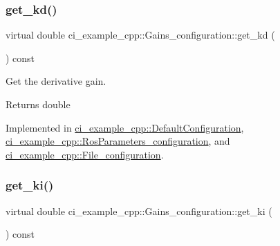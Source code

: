\mbox{\label{classci__example__cpp_1_1Gains__configuration_a4bc25c0a8283f36366b888feaf15efa9}} 
\subsubsection{\texorpdfstring{get\+\_\+kd()}{get\_kd()}}
{\footnotesize\ttfamily virtual double ci\+\_\+example\+\_\+cpp\+::\+Gains\+\_\+configuration\+::get\+\_\+kd (\begin{DoxyParamCaption}{ }\end{DoxyParamCaption}) const\hspace{0.3cm}{\ttfamily [pure virtual]}}



Get the derivative gain. 

\begin{DoxyReturn}{Returns}
double 
\end{DoxyReturn}


Implemented in \hyperlink{classci__example__cpp_1_1DefaultConfiguration_a5eee0c350de525150b04c81a72cd5932}{ci\+\_\+example\+\_\+cpp\+::\+Default\+Configuration}, \hyperlink{classci__example__cpp_1_1RosParameters__configuration_a90eb8bc0d9b4b663cde21fe07d44847e}{ci\+\_\+example\+\_\+cpp\+::\+Ros\+Parameters\+\_\+configuration}, and \hyperlink{classci__example__cpp_1_1File__configuration_a14b1e36766d55ee0132a78fbc41f8096}{ci\+\_\+example\+\_\+cpp\+::\+File\+\_\+configuration}.

\mbox{\label{classci__example__cpp_1_1Gains__configuration_a1ac03c97e04ebfbb3c29122e13b0ec0e}} 
\subsubsection{\texorpdfstring{get\+\_\+ki()}{get\_ki()}}
{\footnotesize\ttfamily virtual double ci\+\_\+example\+\_\+cpp\+::\+Gains\+\_\+configuration\+::get\+\_\+ki (\begin{DoxyParamCaption}{ }\end{DoxyParamCaption}) const\hspace{0.3cm}{\ttfamily [pure virtual]}}



